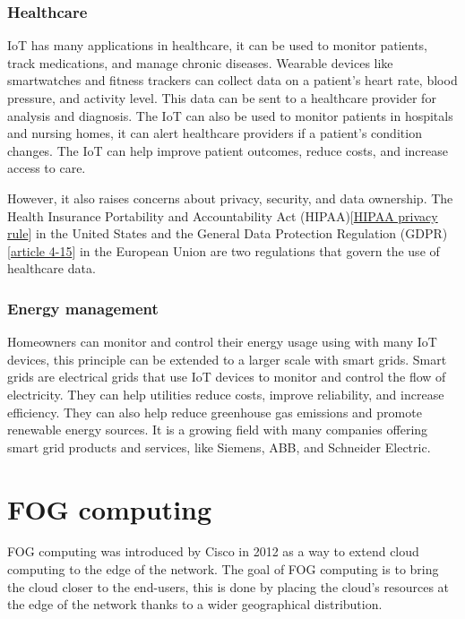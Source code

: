 \subsection{Healthcare}
\label{subsec:iot-healthcare}

IoT has many applications in healthcare, it can be used to monitor patients, track medications, and manage chronic diseases.
Wearable devices like smartwatches and fitness trackers can collect data on a patient's heart rate, blood pressure, and
activity level. This data can be sent to a healthcare provider for analysis and diagnosis. The IoT can also be used to monitor
patients in hospitals and nursing homes, it can alert healthcare providers if a patient's condition changes. The IoT can help
improve patient outcomes, reduce costs, and increase access to care.

However, it also raises concerns about privacy, security, and data ownership. The Health Insurance Portability and Accountability
Act (HIPAA)[\href{https://www.hhs.gov/hipaa/for-professionals/privacy/index.html}{HIPAA privacy rule}] in the United States
and the General Data Protection Regulation
(GDPR)[\href{https://www.cnil.fr/fr/reglement-europeen-protection-donnees/chapitre1#Article4}{article 4-15}] in the European
Union are two regulations that govern the use of healthcare data.

\subsection{Energy management}
\label{subsec:iot-energy-management}

Homeowners can monitor and control their energy usage using with many IoT devices, this principle can be extended to a larger
scale with smart grids. Smart grids are electrical grids that use IoT devices to monitor and control the flow of electricity.
They can help utilities reduce costs, improve reliability, and increase efficiency. They can also help reduce greenhouse gas
emissions and promote renewable energy sources. It is a growing field with many companies offering smart grid products and
services, like Siemens, ABB, and Schneider Electric.

\chapter{FOG computing}
\label{chap:fog}

FOG computing was introduced by Cisco in 2012 as a way to extend cloud computing to the edge of the network. The goal
of FOG computing is to bring the cloud closer to the end-users, this is done by placing the cloud's resources at the
edge of the network thanks to a wider geographical distribution.

